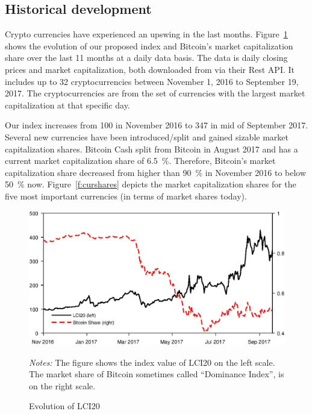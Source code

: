 \documentclass[11pt]{article}
\newcommand\fnotes[1]{\captionsetup{font=scriptsize}\caption*{\textsl{Notes:} #1}}
\begin{document}
\subsection{Historical development}

Crypto currencies have experienced an upswing in the last months.
Figure~\ref{f:lci20} shows the evolution of our proposed index and Bitcoin's market capitalization share over the last 11 months at a daily data basis.
The data is daily closing prices and market capitalization, both downloaded from \citeauthor{CoinCap} via their Rest API.
It includes up to 32 cryptocurrencies between November 1, 2016 to September 19, 2017.
The cryptocurrencies are from the set of currencies with the largest market capitalization at that specific day.

Our index increases from 100 in November 2016 to 347 in mid of September 2017.
Several new currencies have been introduced/split and gained sizable market capitalization shares.
Bitcoin Cash split from Bitcoin in August 2017 and has a current market capitalization share of 6.5~\%.
Therefore, Bitcoin's market capitalization share decreased from higher than 90~\% in November 2016 to below 50~\% now.
Figure~\ref{f:curshares} depicts the market capitalization shares for the five most important currencies (in terms of market shares today).

\begin{figure}[p]%
    \centering%
    \caption{Evolution of LCI20}\label{f:lci20}%
    \includegraphics[width=\textwidth]{figs/lci20.eps}%
    \medskip\newline%
    \fnotes{The figure shows the index value of LCI20 on the left scale. The market share of Bitcoin sometimes called ``Dominance Index'', is on the right scale.}
\end{figure}
\end{document}
